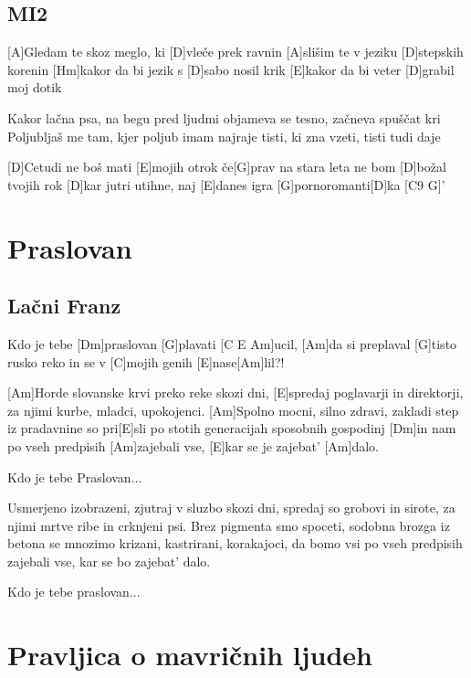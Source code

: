 \documentclass[a4paper,12pt]{article}
\begin{document}
\begin{multicols}{2}
\subsection*{MI2}
\begin{guitar}
[Dsus2 E7 G D C9 G E]

[A]Gledam te skoz meglo, ki [D]vleče prek ravnin
[A]slišim te v jeziku [D]stepskih korenin
[Hm]kakor da bi jezik s [D]sabo nosil krik
[E]kakor da bi veter [D]grabil moj dotik


Kakor lačna psa, na begu pred ljudmi
objameva se tesno, začneva spuščat kri
Poljubljaš me tam, kjer poljub imam najraje
tisti, ki zna vzeti, tisti tudi daje


[D]Cetudi ne boš mati [E]mojih otrok
če[G]prav na stara leta ne bom [D]božal tvojih rok
[D]kar jutri utihne, naj [E]danes igra
[G]pornoromanti[D]ka [C9 G]'

\end{guitar}
\section{Praslovan}
\subsection*{Lačni Franz}
\begin{guitar}
[Am]Kdo je tebe [Dm]praslovan [G]plavati [C E Am]ucil,
[Am]da si preplaval [G]tisto rusko reko
in se v [C]mojih genih [E]nase[Am]lil?!


[Am]Horde slovanske krvi preko reke skozi dni,
[E]spredaj poglavarji in direktorji,
za njimi kurbe, mladci, upokojenci.
[Am]Spolno mocni, silno zdravi,
zakladi step iz pradavnine so pri[E]sli
po stotih generacijah sposobnih gospodinj
[Dm]in nam po vseh predpisih
[Am]zajebali vse, [E]kar se je zajebat' [Am]dalo.


Kdo je tebe Praslovan...


Usmerjeno izobrazeni, 
zjutraj v sluzbo skozi dni,
spredaj so grobovi in sirote,
za njimi mrtve ribe in crknjeni psi.
Brez pigmenta smo spoceti,
sodobna brozga iz betona
se mnozimo krizani, kastrirani, korakajoci,
da bomo vsi po vseh predpisih
zajebali vse, kar se bo zajebat' dalo.


Kdo je tebe praslovan...

\end{guitar}
\section{Pravljica o mavričnih ljudeh}

\end{multicols}
\end{document}
